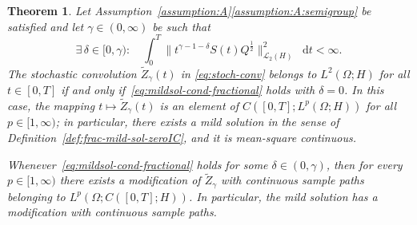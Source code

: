 \documentclass[reqno]{amsart}
\numberwithin{equation}{section}
\newcommand{\rd}{\mathop{}\!\mathrm{d}}
\newtheorem{theorem}[lemma]{Theorem}
\theoremstyle{remark}
\theoremstyle{definition}
\begin{document}
\begin{theorem}\label{thm:existence-mild}  
	Let Assumption~\textup{\ref{assumption:A}\ref{assumption:A:semigroup}}  
	be satisfied and let $\gamma \in (0,\infty)$ be such that
	\begin{equation}\label{eq:mildsol-cond-fractional} 
	\exists \, \delta \in [0,\gamma): 
	\quad 
	\int_0^T 
	\bigl\| t^{\gamma-1-\delta} S(t) Q^{ \frac{1}{2} } \bigr\|_{\mathscr L_2(H)}^2 
	\rd t 
	< \infty. 
	\end{equation} 
	The stochastic convolution 
	$\widetilde{Z}_\gamma(t)$ in \eqref{eq:stoch-conv}
	belongs to  
	$L^2(\Omega;H)$  
	for all $t\in [0,T]$ if and only if~\eqref{eq:mildsol-cond-fractional}
	holds with $\delta=0$.
	In this case,
	the mapping 
	$t\mapsto \widetilde{Z}_\gamma(t)$ 
	is an element of $C([0,T];L^p(\Omega;H))$ 
	for all $p\in[1,\infty)$; in particular, 
	there exists a mild solution  
	in the sense of Definition~\textup{\ref{def:frac-mild-sol-zeroIC}}, 
	and it is mean-square continuous. 
	
	Whenever~\eqref{eq:mildsol-cond-fractional}
	holds for some $\delta\in(0,\gamma)$, 
	then for every $p \in [1,\infty)$ 
	there exists a modification 
	of $\widetilde Z_\gamma$ with continuous sample paths 
	belonging 
	to $L^p(\Omega;C([0,T];H))$. 
	In particular, the mild solution has a modification 
	with continuous sample paths.
\end{theorem}
\end{document}
